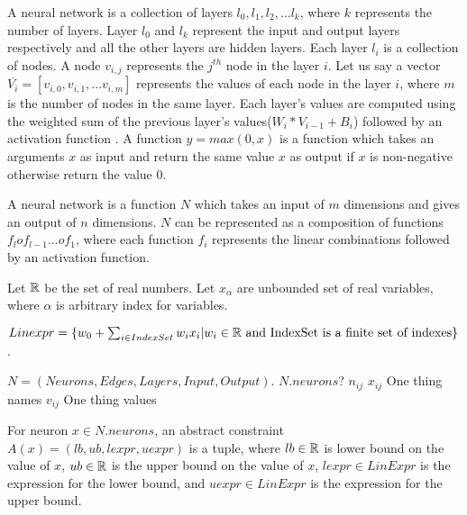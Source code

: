 A neural network is a collection of layers $l_0, l_1, l_2, ... l_k$, where $k$ represents the number of layers. 
Layer $l_0$ and $l_k$ represent the input and output layers respectively and all the other layers are hidden layers.
Each layer $l_i$ is a collection of nodes. A node $v_{i,j}$ represents the $j^{th}$ node in the layer $i$. 
Let us say a vector $\overline{V_i} = [v_{i,0}, v_{i,1}, ... v_{i,m}]$ represents the values of each node in the layer $i$, where $m$ is the number of nodes in the same layer. 
Each layer's values are computed using the weighted sum of the previous layer's values($W_i * V_{i-1} + B_i$) followed by an activation function
\relu{}. A function $y = max(0,x)$ is a \relu{} function which takes an arguments $x$ as input and return the same value $x$ as output if 
$x$ is non-negative otherwise return the value 0. 

A neural network is a function $N$ which takes an input of $m$ dimensions and gives an output of $n$ dimensions.
$N$ can be represented as a composition of functions $f_l o f_{l-1} ... o f_1$, where each function $f_i$ represents the linear combinations followed by an activation function. 

Let $\mathbb{R}$ be the set of real numbers.
Let $x_{\alpha}$ are unbounded set of real variables, where
$\alpha$ is arbitrary index for variables.

\begin{df}
  $Linexpr = \{ w_0 + \sum_{i \in IndexSet} w_i x_i | w_i \in \mathbb{R} \text{ and IndexSet is a finite set of indexes} \}$.
\end{df}

\begin{df}
  $N = (Neurons, Edges, Layers, Input, Output )$.
  $N.neurons$?
  $n_{ij}$
  $x_{ij}$ One thing names
  $v_{ij}$ One thing values
\end{df}


\begin{df}
  For neuron $x \in N.neurons$,
  an abstract constraint $A(x) = (lb,ub, lexpr, uexpr)$ is a tuple, where
  $lb \in \mathbb{R}$ is lower bound on the value of $x$,
  $ub \in \mathbb{R}$ is the upper bound on the value of  $x$,
  $lexpr \in LinExpr$ is the expression for the lower bound, and
  $uexpr \in LinExpr$ is the expression for the upper bound.
\end{df}

